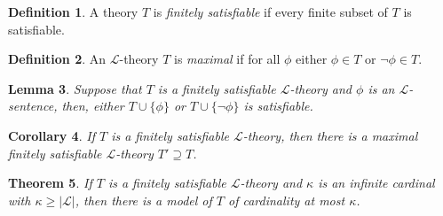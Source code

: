 \documentclass{amsart}
\newtheorem{theorem}{Theorem}[section]
\newtheorem{lemma}[theorem]{Lemma}
\newtheorem{corollary}[theorem]{Corollary}
\theoremstyle{definition}
\newtheorem{definition}[theorem]{Definition}
\numberwithin{equation}{section}
\begin{document}
\begin{definition}
    A theory $T$ is \emph{finitely satisfiable} if every finite subset of $T$ is satisfiable.
\end{definition}


\begin{definition}
    An $\mathcal{L}$-theory $T$ is \emph{maximal} if for all $\phi$ either $\phi \in T$ or $\neg \phi \in T$. 
\end{definition}



\begin{lemma}
    Suppose that $T$ is a finitely satisfiable $\mathcal{L}$-theory and $\phi$ is an $\mathcal{L}$-sentence, then,
    either $T \cup \{\phi\}$ or $T \cup \{\neg\phi\}$ is satisfiable.
\end{lemma}

\begin{corollary}
    If $T$ is a finitely satisfiable $\mathcal{L}$-theory,
    then there is a maximal finitely satisfiable $\mathcal{L}$-theory $T' \supseteq T$.
\end{corollary}

\begin{theorem}
    If $T$ is a finitely satisfiable $\mathcal{L}$-theory and $\kappa$ is an infinite cardinal with $\kappa \ge |\mathcal{L}|$,
    then there is a model of $T$ of cardinality at most $\kappa$. 
\end{theorem}
\end{document}
